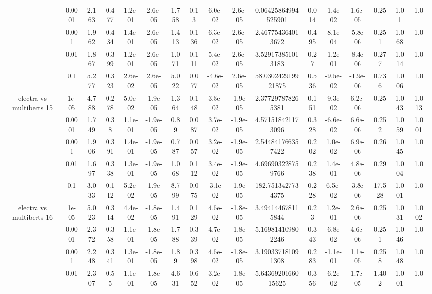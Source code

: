 \begin{tabular}{|c|c|c|c|c|c|c|c|c|c|c|c|c|c|c|c|c|}
 & 0.0001 & 2.163 & 0.477 & 1.2e-01 & 2.6e-05 & 1.758 & 0.13 & 6.0e-02 & 2.6e-05 & 0.06425864994525901 & 0.014 & -1.4e-02 & 1.6e-05 & 0.25 & 1.01 & 1.0 \\
 & 0.001 & 1.962 & 0.434 & 1.4e-01 & 2.6e-05 & 1.413 & 0.136 & 6.3e-02 & 2.6e-05 & 2.467754364013672 & 0.495 & -8.1e-04 & -5.8e-06 & 0.251 & 1.068 & 1.0 \\
 & 0.01 & 1.867 & 0.399 & 1.2e-01 & 2.6e-05 & 1.071 & 0.111 & 5.4e-02 & 2.6e-05 & 3.529173851013183 & 0.27 & -1.2e-01 & -8.4e-06 & 0.277 & 1.014 & 1.0 \\
 & 0.1 & 5.277 & 0.323 & 2.6e-02 & 2.6e-05 & 5.022 & 0.077 & -4.6e-02 & 2.6e-05 & 58.030242919921875 & 0.536 & -9.5e-02 & -1.9e-06 & 0.736 & 1.006 & 1.0 \\
\hline
\multirow{5}{*}{electra  vs multiberts 15} & 1e-05 & 4.788 & 0.278 & 5.0e-02 & -1.9e-05 & 1.364 & 0.148 & 3.8e-02 & -1.9e-05 & 2.377297878265381 & 0.151 & -9.3e-02 & 6.2e-06 & 0.25 & 1.043 & 1.013 \\
 & 0.0001 & 1.749 & 0.38 & 1.1e-01 & -1.9e-05 & 0.89 & 0.087 & 3.7e-02 & -1.9e-05 & 4.571518421173096 & 0.328 & -6.6e-02 & 6.6e-06 & 0.252 & 1.059 & 1.001 \\
 & 0.001 & 1.906 & 0.391 & 1.4e-01 & -1.9e-05 & 0.787 & 0.057 & 3.2e-02 & -1.9e-05 & 2.544841766357422 & 0.202 & 1.0e-02 & 6.9e-06 & 0.26 & 1.045 & 1.0 \\
 & 0.01 & 1.697 & 0.338 & 1.3e-01 & -1.9e-05 & 1.068 & 0.112 & 3.4e-02 & -1.9e-05 & 4.696903228759766 & 0.238 & 1.4e-01 & 4.8e-06 & 0.29 & 1.004 & 1.0 \\
 & 0.1 & 3.033 & 0.112 & 5.2e-02 & -1.9e-05 & 8.799 & 0.075 & -3.1e-02 & -1.9e-05 & 182.7513427734375 & 0.228 & 6.5e-02 & -3.8e-06 & 17.528 & 1.001 & 1.0 \\
\hline
\multirow{5}{*}{electra  vs multiberts 16} & 1e-05 & 5.023 & 0.314 & 4.4e-02 & -1.8e-05 & 1.491 & 0.129 & 4.5e-02 & -1.8e-05 & 3.494144678115844 & 0.23 & 1.2e-01 & 2.6e-06 & 0.25 & 1.031 & 1.002 \\
 & 0.0001 & 2.372 & 0.358 & 1.1e-01 & -1.8e-05 & 1.788 & 0.339 & 4.7e-02 & -1.8e-05 & 5.169814109802246 & 0.343 & -6.8e-02 & 4.6e-06 & 0.251 & 1.046 & 1.0 \\
 & 0.001 & 2.248 & 0.341 & 1.3e-01 & -1.8e-05 & 1.89 & 0.398 & 4.5e-02 & -1.8e-05 & 3.190337181091308 & 0.283 & -1.1e-01 & 1.1e-05 & 0.258 & 1.048 & 1.0 \\
 & 0.01 & 2.307 & 0.55 & 1.1e-01 & -1.8e-05 & 4.631 & 0.652 & 3.2e-02 & -1.8e-05 & 5.6436920166015625 & 0.356 & -6.2e-02 & 1.7e-05 & 1.402 & 1.001 & 1.0 \\

\end{tabular}
